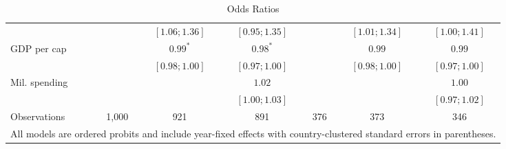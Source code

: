 \begin{table}[h!]
\begin{center}
\begin{tabular}{l c c c c c c}
                      &                 & $ [1.06; 1.36]$ & $ [0.95; 1.35]$ &                 & $ [1.01; 1.34]$ & $ [1.00; 1.41]$ \\
\quad GDP per cap     &                 & $0.99^{*}$      & $0.98^{*}$      &                 & $0.99$          & $0.99$          \\
                      &                 & $ [0.98; 1.00]$ & $ [0.97; 1.00]$ &                 & $ [0.98; 1.00]$ & $ [0.97; 1.00]$ \\
\quad Mil. spending   &                 &                 & $1.02$          &                 &                 & $1.00$          \\
                      &                 &                 & $ [1.00; 1.03]$ &                 &                 & $ [0.97; 1.02]$ \\
\hline
Observations          & 1,000           & 921             & 891             & 376             & 373             & 346             \\
\hline
\multicolumn{7}{l}{\scriptsize{All models are ordered probits and include year-fixed effects with country-clustered standard errors in parentheses.}}
\end{tabular}
\caption{Odds Ratios}
\label{table:coefficients}
\end{center}
\end{table}
